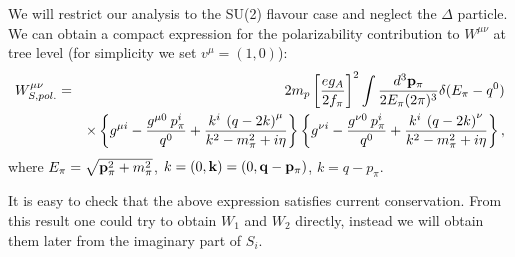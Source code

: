 \documentclass[a4paper,12pt]{article}
\newcommand{\bea}{\begin{eqnarray}}
\newcommand{\eea}{\end{eqnarray}}
\newcommand{\pref}{2m_{p}\left[\frac{eg_{A}}{2f_{\pi}}\right]^{2}}
\begin{document}
We will restrict our analysis to the SU(2) flavour case  
and neglect the $\Delta$ particle. 
We can obtain a compact expression for the polarizability 
contribution to $W^{\mu\nu}$ 
at tree level (for simplicity we set $v^{\mu}=(1,0)$):
\bea
\label{Wpol}
W_{S,pol.}^{\mu\nu}&=&\pref\int \frac{d^3{\bf p}_{\pi}}{2E_{\pi}(2\pi)^3}\delta(E_{\pi}-q^0)
\\
&&
\times
\left\{g^{\mu i}-\frac{g^{\mu 0}\:p^{i}_{\pi}}{q^0}+\frac{k^{i}\:\left(q-2k\right)^{\mu}}
{k^2-m_{\pi}^2+i\eta}\right\}\left\{g^{\nu i}-\frac{g^{\nu 0}\:p^{i}_{\pi}}{q^0}+
\frac{k^{i}\:\left(q-2k\right)^{\nu}}{k^2-m_{\pi}^2+i\eta}\right\},\nonumber
\eea
where $E_{\pi}=\sqrt{{\bf p}_{\pi}^2+m^2_{\pi}}$, $k=(0,{\bf k})=(0,{\bf q-p_{\pi}})$, $k=q-p_{\pi}$.

It is easy to check that the above expression satisfies current conservation. From this result one 
could try to obtain $W_1$ and $W_2$ directly, instead we will obtain them later from the 
imaginary part of $S_i$. 
\end{document}
